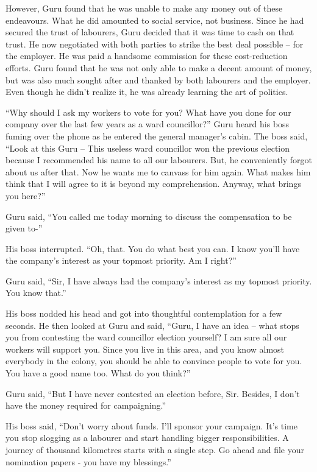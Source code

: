 However, Guru found that he was unable to make any money out of these endeavours.
What he did amounted to social service, not business. Since he had secured the
trust of labourers, Guru decided that it was time to cash on that trust. He now
negotiated with both parties to strike the best deal possible – for the
employer. He was paid a handsome commission for these cost-reduction efforts.
Guru found that he was not only able to make a decent amount of money, but was
also much sought after and thanked by both labourers and the employer. Even
though he didn't realize it, he was already learning the art of politics.

“Why should I ask my workers to vote for you? What have you done for our company
over the last few years as a ward councillor?” Guru heard his boss fuming over
the phone as he entered the general manager's cabin. The boss said, “Look at
this Guru – This useless ward councillor won the previous election because I
recommended his name to all our labourers. But, he conveniently forgot about us
after that. Now he wants me to canvass for him again. What makes him think that
I will agree to it is beyond my comprehension. Anyway, what brings you here?”

Guru said, “You called me today morning to discuss the compensation to be
given to-”

His boss interrupted. “Oh, that. You do what best you can. I know you'll have
the company's interest as your topmost priority. Am I right?”

Guru said, “Sir, I have always had the company's interest as my topmost
priority. You know that.”

His boss nodded his head and got into thoughtful contemplation for a few
seconds. He then looked at Guru and said, “Guru, I have an idea – what stops you
from contesting the ward councillor election yourself? I am sure all our workers
will support you. Since you live in this area, and you know almost everybody in
the colony, you should be able to convince people to vote for you. You have a
good name too. What do you think?”

Guru said, “But I have never contested an election before, Sir. Besides, I don't
have the money required for campaigning.”

His boss said, “Don't worry about funds. I'll sponsor your campaign. It's time
you stop slogging as a labourer and start handling bigger responsibilities. A
journey of thousand kilometres starts with a single step. Go ahead and file your
nomination papers - you have my blessings.”

